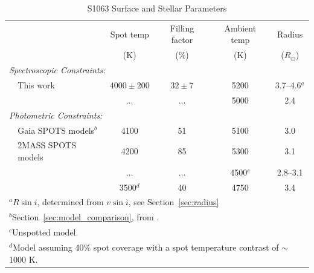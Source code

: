 \documentclass[trackchanges]{aastex631}
\begin{document}
\begin{table}[]
\label{tab:s1063parameters}
\caption{S1063 Surface and Stellar Parameters}
\begin{tabular}{llcccc}

  &         & Spot temp  & Filling factor & Ambient temp & Radius  \\
   &        &  (K) & (\%) &  (K) & ($R_{\odot}$) \\ \hline
\multicolumn{3}{l}{\textit{Spectroscopic Constraints:}}  \\
\phantom{EEE} & This work     & $4000\pm200$  & $32\pm7$    & 5200 &   3.7--4.6$^{a}$     \\
& \citet{mathieu03} &  ...    &  ...    &     5000    &  2.4  \\
\multicolumn{3}{l}{\textit{Photometric Constraints:}} \\
& Gaia SPOTS models$^{b}$  &   4100   &  51  &   5100  &   3.0  \\
& 2MASS SPOTS models &   4200   & 85    &   5300  &    3.1    \\
& \citet{leiner17} & ... & ... & 4500$^{c}$ & 2.8--3.1 \\
& & 3500$^{d}$ & 40 & 4750 & 3.4 \\
\hline
\multicolumn{6}{l}{$^{a}$$R \sin i$, determined from $v\sin i$, see Section~\ref{sec:radius}} \\
\multicolumn{6}{l}{$^{b}$Section~\ref{sec:model_comparison}, from \citet{somers20}.} \\
\multicolumn{6}{l}{$^{c}$Unspotted model.} \\
\multicolumn{6}{l}{$^{d}$Model assuming 40\% spot coverage with a spot temperature contrast of $\sim$1000 K.}
\end{tabular}
\end{table}
\end{document}
